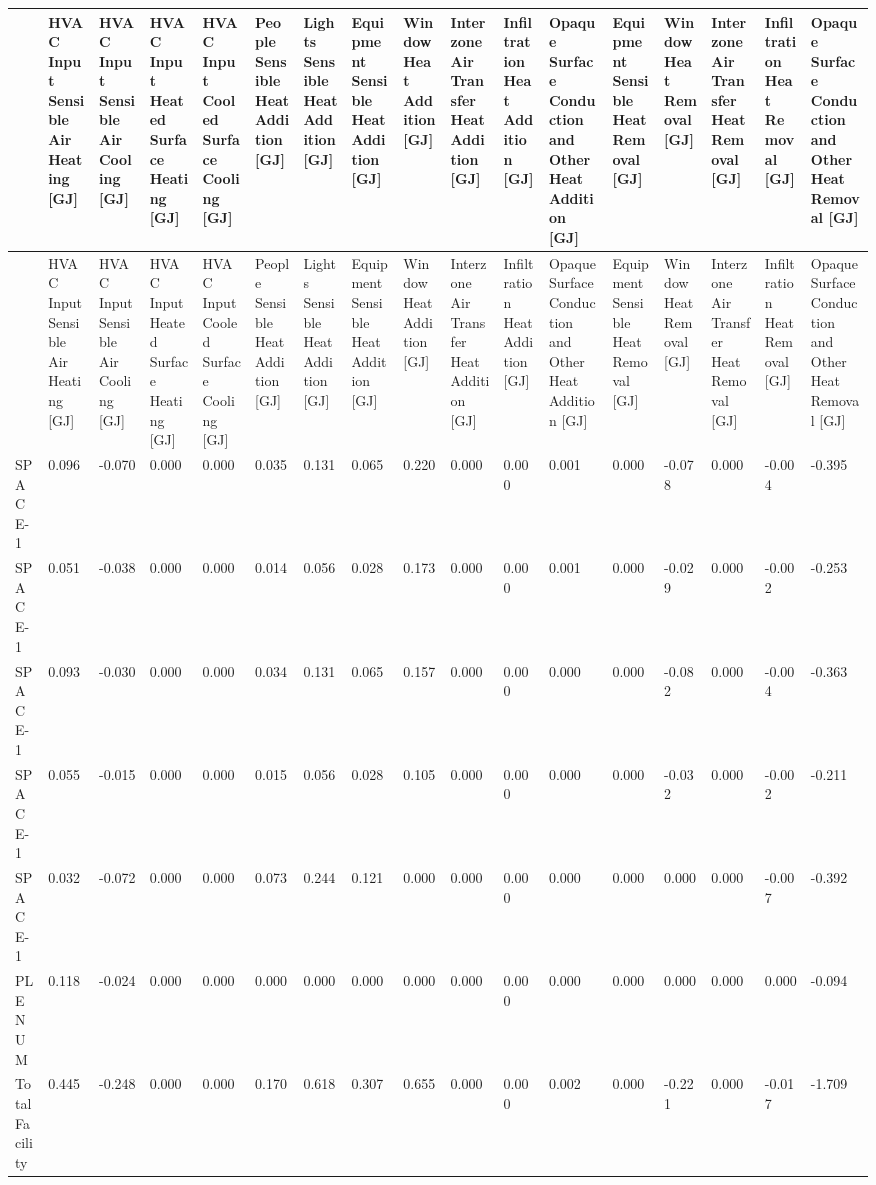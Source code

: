 {\tiny
\begin{longtable}[c]{>{\raggedright}p{0.28in}>{\raggedright}p{0.28in}>{\raggedright}p{0.28in}>{\raggedright}p{0.28in}>{\raggedright}p{0.28in}>{\raggedright}p{0.28in}>{\raggedright}p{0.28in}>{\raggedright}p{0.28in}>{\raggedright}p{0.28in}>{\raggedright}p{0.28in}>{\raggedright}p{0.28in}>{\raggedright}p{0.28in}>{\raggedright}p{0.28in}>{\raggedright}p{0.28in}>{\raggedright}p{0.28in}>{\raggedright}p{0.28in}>{\raggedright}p{0.28in}}
\toprule
 & HVAC Input Sensible Air Heating [GJ] & HVAC Input Sensible Air Cooling [GJ] & HVAC Input Heated Surface Heating [GJ] & HVAC Input Cooled Surface Cooling [GJ] & People Sensible Heat Addition [GJ] & Lights Sensible Heat Addition [GJ] & Equipment Sensible Heat Addition [GJ] & Window Heat Addition [GJ] & Interzone Air Transfer Heat Addition [GJ] & Infiltration Heat Addition [GJ] & Opaque Surface Conduction and Other Heat Addition [GJ] & Equipment Sensible Heat Removal [GJ] & Window Heat Removal [GJ] & Interzone Air Transfer Heat Removal [GJ] & Infiltration Heat Removal [GJ] & Opaque Surface Conduction and Other Heat Removal [GJ] \tabularnewline
\midrule
\endfirsthead

\toprule
 & HVAC Input Sensible Air Heating [GJ] & HVAC Input Sensible Air Cooling [GJ] & HVAC Input Heated Surface Heating [GJ] & HVAC Input Cooled Surface Cooling [GJ] & People Sensible Heat Addition [GJ] & Lights Sensible Heat Addition [GJ] & Equipment Sensible Heat Addition [GJ] & Window Heat Addition [GJ] & Interzone Air Transfer Heat Addition [GJ] & Infiltration Heat Addition [GJ] & Opaque Surface Conduction and Other Heat Addition [GJ] & Equipment Sensible Heat Removal [GJ] & Window Heat Removal [GJ] & Interzone Air Transfer Heat Removal [GJ] & Infiltration Heat Removal [GJ] & Opaque Surface Conduction and Other Heat Removal [GJ] \tabularnewline
\midrule
\endhead

SPACE\-1-1 & 0.096 & -0.070 & 0.000 & 0.000 & 0.035 & 0.131 & 0.065 & 0.220 & 0.000 & 0.000 & 0.001 & 0.000 & -0.078 & 0.000 & -0.004 & -0.395 \tabularnewline
SPACE\-2-1 & 0.051 & -0.038 & 0.000 & 0.000 & 0.014 & 0.056 & 0.028 & 0.173 & 0.000 & 0.000 & 0.001 & 0.000 & -0.029 & 0.000 & -0.002 & -0.253 \tabularnewline
SPACE\-3-1 & 0.093 & -0.030 & 0.000 & 0.000 & 0.034 & 0.131 & 0.065 & 0.157 & 0.000 & 0.000 & 0.000 & 0.000 & -0.082 & 0.000 & -0.004 & -0.363 \tabularnewline
SPACE\-4-1 & 0.055 & -0.015 & 0.000 & 0.000 & 0.015 & 0.056 & 0.028 & 0.105 & 0.000 & 0.000 & 0.000 & 0.000 & -0.032 & 0.000 & -0.002 & -0.211 \tabularnewline
SPACE\-5-1 & 0.032 & -0.072 & 0.000 & 0.000 & 0.073 & 0.244 & 0.121 & 0.000 & 0.000 & 0.000 & 0.000 & 0.000 & 0.000 & 0.000 & -0.007 & -0.392 \tabularnewline
PLE\-NUM\--1 & 0.118 & -0.024 & 0.000 & 0.000 & 0.000 & 0.000 & 0.000 & 0.000 & 0.000 & 0.000 & 0.000 & 0.000 & 0.000 & 0.000 & 0.000 & -0.094 \tabularnewline
Total Facility & 0.445 & -0.248 & 0.000 & 0.000 & 0.170 & 0.618 & 0.307 & 0.655 & 0.000 & 0.000 & 0.002 & 0.000 & -0.221 & 0.000 & -0.017 & -1.709 \tabularnewline
\bottomrule
\end{longtable}}

